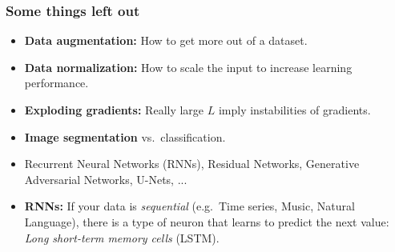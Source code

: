 \documentclass[10pt,hyperref={pdfpagelabels=false}]{beamer}
\begin{document}
\begin{frame}
    \frametitle{Some things left out}
    \begin{itemize}
        \item {\bf Data augmentation:} How to get more out of a dataset.
        \item {\bf Data normalization:} How to scale the input to increase learning performance.
        \item {\bf Exploding gradients:} Really large $L$ imply instabilities of gradients.
        \item {\bf Image segmentation} vs.~classification.
        \item Recurrent Neural Networks (RNNs), Residual Networks, Generative Adversarial Networks, U-Nets, ...
        \item {\bf RNNs:} If your data is \emph{sequential} (e.g.~Time series, Music, Natural Language), there is a type of neuron that learns to predict the next value: \emph{Long short-term memory cells} (LSTM).
    \end{itemize}
\end{frame}
\end{document}
